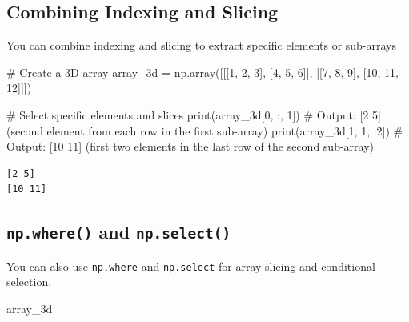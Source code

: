 \documentclass[
  letterpaper,
  DIV=11,
  numbers=noendperiod]{scrreprt}
\newenvironment{Shaded}{\begin{snugshade}}{\end{snugshade}}
\newcommand{\BuiltInTok}[1]{\textcolor[rgb]{0.00,0.23,0.31}{#1}}
\newcommand{\CommentTok}[1]{\textcolor[rgb]{0.37,0.37,0.37}{#1}}
\newcommand{\DecValTok}[1]{\textcolor[rgb]{0.68,0.00,0.00}{#1}}
\newcommand{\NormalTok}[1]{\textcolor[rgb]{0.00,0.23,0.31}{#1}}
\newcommand{\OperatorTok}[1]{\textcolor[rgb]{0.37,0.37,0.37}{#1}}
\begin{document}
\hypertarget{combining-indexing-and-slicing}{%
\subsection{Combining Indexing and
Slicing}\label{combining-indexing-and-slicing}}

You can combine indexing and slicing to extract specific elements or
sub-arrays

\begin{Shaded}
\begin{Highlighting}[]
\CommentTok{\# Create a 3D array}
\NormalTok{array\_3d }\OperatorTok{=}\NormalTok{ np.array([[[}\DecValTok{1}\NormalTok{, }\DecValTok{2}\NormalTok{, }\DecValTok{3}\NormalTok{], [}\DecValTok{4}\NormalTok{, }\DecValTok{5}\NormalTok{, }\DecValTok{6}\NormalTok{]], [[}\DecValTok{7}\NormalTok{, }\DecValTok{8}\NormalTok{, }\DecValTok{9}\NormalTok{], [}\DecValTok{10}\NormalTok{, }\DecValTok{11}\NormalTok{, }\DecValTok{12}\NormalTok{]]])}

\CommentTok{\# Select specific elements and slices}
\BuiltInTok{print}\NormalTok{(array\_3d[}\DecValTok{0}\NormalTok{, :, }\DecValTok{1}\NormalTok{])  }\CommentTok{\# Output: [2 5] (second element from each row in the first sub{-}array)}
\BuiltInTok{print}\NormalTok{(array\_3d[}\DecValTok{1}\NormalTok{, }\DecValTok{1}\NormalTok{, :}\DecValTok{2}\NormalTok{])  }\CommentTok{\# Output: [10 11] (first two elements in the last row of the second sub{-}array)}
\end{Highlighting}
\end{Shaded}

\begin{verbatim}
[2 5]
[10 11]
\end{verbatim}

\hypertarget{np.where-and-np.select}{%
\subsection{\texorpdfstring{\texttt{np.where()} and
\texttt{np.select()}}{np.where() and np.select()}}\label{np.where-and-np.select}}

You can also use \texttt{np.where} and \texttt{np.select} for array
slicing and conditional selection.

\begin{Shaded}
\begin{Highlighting}[]
\NormalTok{array\_3d}
\end{Highlighting}
\end{Shaded}
\end{document}
